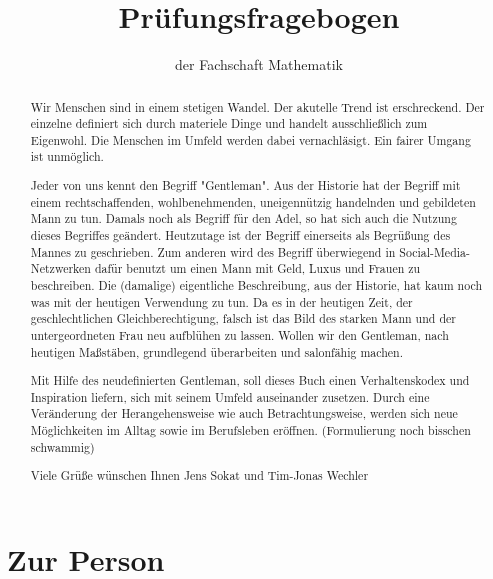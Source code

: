 \documentclass[a4paper,12pt]{scrartcl}
\begin{document}
\title{Prüfungsfragebogen}
\author{der Fachschaft Mathematik}
\date{}
\maketitle

\begin{abstract}
    Wir Menschen sind in einem stetigen Wandel. Der akutelle Trend ist erschreckend. Der einzelne definiert sich durch materiele Dinge und handelt ausschließlich zum Eigenwohl. Die Menschen im Umfeld werden dabei vernachläsigt. Ein fairer Umgang ist unmöglich.\par\smallskip

    Jeder von uns kennt den Begriff "Gentleman". Aus der Historie hat der Begriff mit einem rechtschaffenden, wohlbenehmenden, uneigennützig handelnden und gebildeten Mann zu tun. Damals noch als Begriff für den Adel, so hat sich auch die Nutzung dieses Begriffes geändert. Heutzutage ist der Begriff einerseits als Begrüßung des Mannes zu geschrieben. Zum anderen wird des Begriff überwiegend in Social-Media-Netzwerken dafür benutzt um einen Mann mit Geld, Luxus und Frauen zu beschreiben. Die (damalige) eigentliche Beschreibung, aus der Historie, hat kaum noch was mit der heutigen Verwendung zu tun. 
    Da es in der heutigen Zeit, der geschlechtlichen Gleichberechtigung, falsch ist das Bild des starken Mann und der untergeordneten Frau neu aufblühen zu lassen. Wollen wir den Gentleman, nach heutigen Maßstäben, grundlegend überarbeiten und salonfähig machen.\par\smallskip 
    
    Mit Hilfe des neudefinierten Gentleman, soll dieses Buch einen Verhaltenskodex und Inspiration liefern, sich mit seinem Umfeld  auseinander zusetzen. Durch eine Veränderung der Herangehensweise wie auch Betrachtungsweise, werden sich neue Möglichkeiten im Alltag sowie im Berufsleben eröffnen. (Formulierung noch bisschen schwammig)
    
    Viele Grüße wünschen Ihnen
    Jens Sokat und Tim-Jonas Wechler
\end{abstract}

\section*{Zur Person}
\end{document}
